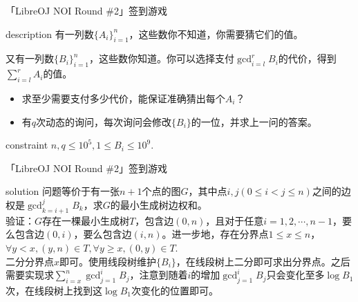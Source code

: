 \documentclass{beamer}
\def\le{\leqslant}
\def\ge{\geqslant}
\begin{document}
\begin{frame}{「LibreOJ NOI Round \#2」签到游戏}
	\begin{block}{description}
		有一列数$\{A_i\}_{i=1}^{n}$，这些数你不知道，你需要猜它们的值。

		又有一列数$\{B_i\}_{i=1}^{n}$，这些数你知道。你可以选择支付$\gcd_{i=l}^{r}B_i$的代价，得到$\sum_{i=l}^{r}A_i$的值。

		\begin{itemize}
			\item 求至少需要支付多少代价，能保证准确猜出每个$A_i$？
			\item 有$q$次动态的询问，每次询问会修改$\{B_i\}$的一位，并求上一问的答案。
		\end{itemize}
	\end{block}
	\begin{block}{constraint}
		$n, q \le 10^5, 1 \le B_i \le 10^9.$
	\end{block}
\end{frame}
\begin{frame}{「LibreOJ NOI Round \#2」签到游戏}
	\begin{block}{solution}
		问题等价于有一张$n + 1$个点的图$G$，其中点$i, j(0 \le i < j \le n)$之间的边权是$\gcd_{k=i+1}^{j} B_k$，求$G$的最小生成树边权和。\pause\\
		
		验证：$G$存在一棵最小生成树$T$，包含边$(0, n)$，且对于任意$i = 1, 2, \cdots, n-1$，要么包含边$(0, i)$，要么包含边$(i, n)$。进一步地，存在分界点$1 \le x \le n$，$\forall y < x, (y, n) \in T, \forall y \ge x, (0, y) \in T.$\pause\\

		二分分界点$x$即可。使用线段树维护$\{B_i\}$，在线段树上二分即可求出分界点。之后需要实现求$\sum_{i=x}^{n}\gcd_{j=1}^{i}B_j$，注意到随着$i$的增加$\gcd_{j=1}^{i}B_j$只会变化至多$\log B_1$次，在线段树上找到这$\log B_1$次变化的位置即可。

	\end{block}
\end{frame}
\end{document}
